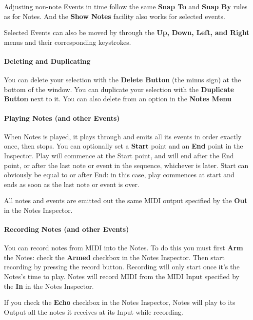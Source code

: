 \documentclass[twoside,10pt]{article}
\begin{document}
Adjusting non-note Events in time follow the same {\bf Snap To} and {\bf Snap By} rules as for Notes.  And the {\bf Show Notes} facility also works for selected events.

Selected Events can also be moved by through the {\bf Up, Down, Left, and Right} menus and their corresponding keystrokes. 

\paragraph{Deleting and Duplicating}

You can delete your selection with the {\bf Delete Button} (the minus sign) at the bottom of the window.  You can duplicate your selection with the {\bf Duplicate Button} next to it.  You can also delete from an option in the {\bf Notes Menu}  

\paragraph{Playing Notes (and other Events)}

When Notes is played, it plays through and emits all its events in order exactly once, then stops.  You can optionally set a {\bf Start} point and an {\bf End} point in the Inspector.  Play will commence at the Start point, and will end after the End point, or after the last note or event in the sequence, whichever is later.  Start can obviously be equal to or after End: in this case, play commences at start and ends as soon as the last note or event is over.

All notes and events are emitted out the same MIDI output specified by the {\bf Out} in the Notes Inspector.

\paragraph{Recording Notes (and other Events)}

You can record notes from MIDI into the Notes.  To do this you must first {\bf Arm} the Notes: check the {\bf Armed} checkbox in the Notes Inspector.  Then start recording by pressing the record button.  Recording will only start once it's the Notes's time to play.  Notes will record MIDI from the MIDI Input specified by the {\bf In} in the Notes Inspector.

If you check the {\bf Echo} checkbox in the Notes Inspector, Notes will play to its Output all the notes it receives at its Input while recording.
\end{document}
